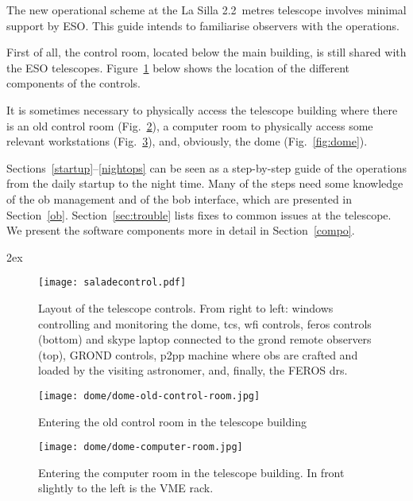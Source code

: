 \documentclass[11pt,fleqn]{book} %
\begin{document}
The new operational scheme at the La Silla 2.2~metres telescope involves
minimal support by ESO.  This guide intends to familiarise observers with the
operations. 

First of all, the control room, located below the main building, is still
shared with the ESO telescopes.  Figure~\ref{fig:saladecontrol}  below
shows the location of the different components of the controls. 

It is sometimes necessary to physically access the telescope building where
there is an old control room (Fig.~\ref{fig:old-control-room}), a computer room to physically access some relevant workstations (Fig.~\ref{fig:computer-room}), and, obviously, the dome (Fig.~\ref{fig:dome}).

Sections~\ref{startup}--\ref{nightops} can be seen as a step-by-step guide of
the operations from the daily startup to the night time. Many of the steps need
some knowledge of the \gls{ob} management and of the \gls{bob} interface, which
are presented in Section~\ref{ob}.  Section~\ref{sec:trouble} lists fixes to common issues at the telescope.  We present the software components more in detail in Section~\ref{compo}.

\vglue 2ex

\begin{figure}[!ht] \texttt{[image: saladecontrol.pdf]}
\caption[Layout of the telescope controls]{Layout of the telescope controls.  From right to left: \gls{windows} 
controlling and monitoring the dome, \acrlong{tcs}, \acrshort{wfi} controls,
\acrshort{feros} controls (bottom) and skype laptop connected to the \acrshort{grond}
remote observers (top), GROND controls, \acrshort{p2pp} machine where
\acrshort{ob}s are crafted and loaded by the visiting astronomer, and,
finally, the FEROS \acrlong{drs}.}
\label{fig:saladecontrol} 
\end{figure}

\begin{figure}[!ht]
\texttt{[image: dome/dome-old-control-room.jpg]}
\caption{Entering the old control room in the telescope building}
\label{fig:old-control-room}
\end{figure}

\begin{figure}[!ht]
\texttt{[image: dome/dome-computer-room.jpg]}
\caption[Entering the computer room in the telescope building]{Entering the computer room in the telescope building. In front slightly to the left is the VME rack.} 
\label{fig:computer-room}
\end{figure}
\end{document}
